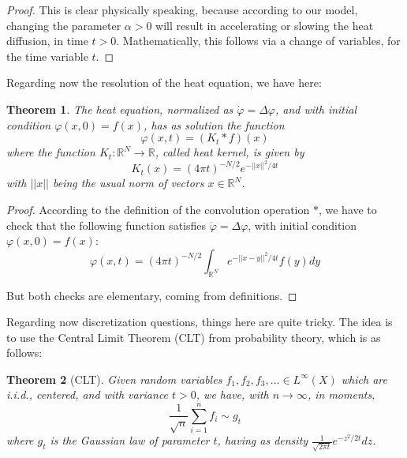 \documentclass[12pt]{amsbook}
\newtheorem{theorem}{Theorem}[chapter]
\begin{document}
\begin{proof}
This is clear physically speaking, because according to our model, changing the parameter $\alpha>0$ will result in accelerating or slowing the heat diffusion, in time $t>0$. Mathematically, this follows via a change of variables, for the time variable $t$.
\end{proof}

Regarding now the resolution of the heat equation, we have here:


\begin{theorem}
The heat equation, normalized as $\dot\varphi=\Delta\varphi$, and with initial condition $\varphi(x,0)=f(x)$, has as solution the function
$$\varphi(x,t)=(K_t*f)(x)$$
where the function $K_t:\mathbb R^N\to\mathbb R$, called heat kernel, is given by
$$K_t(x)=(4\pi t)^{-N/2}e^{-||x||^2/4t}$$
with $||x||$ being the usual norm of vectors $x\in\mathbb R^N$.
\end{theorem}

\begin{proof}
According to the definition of the convolution operation $*$, we have to check that the following function satisfies $\dot\varphi=\Delta\varphi$, with initial condition $\varphi(x,0)=f(x)$:
$$\varphi(x,t)=(4\pi t)^{-N/2}\int_{\mathbb R^N}e^{-||x-y||^2/4t}f(y)dy$$

But both checks are elementary, coming from definitions.
\end{proof}

Regarding now discretization questions, things here are quite tricky. The idea is to use the Central Limit Theorem (CLT) from probability theory, which is as follows:


\begin{theorem}[CLT]
Given random variables $f_1,f_2,f_3,\ldots\in L^\infty(X)$ which are i.i.d., centered, and with variance $t>0$, we have, with $n\to\infty$, in moments,
$$\frac{1}{\sqrt{n}}\sum_{i=1}^nf_i\sim g_t$$
where $g_t$ is the Gaussian law of parameter $t$, having as density $\frac{1}{\sqrt{2\pi t}}e^{-z^2/2t}dz$.
\end{theorem}
\end{document}
